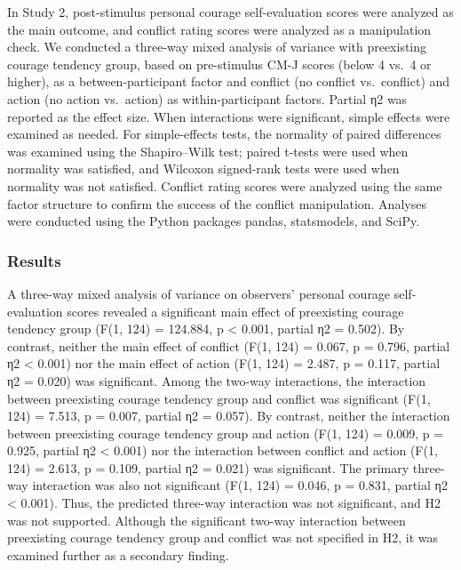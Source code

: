\documentclass[
]{article}
\begin{document}
In Study 2, post-stimulus personal courage self-evaluation scores were
analyzed as the main outcome, and conflict rating scores were analyzed
as a manipulation check. We conducted a three-way mixed analysis of
variance with preexisting courage tendency group, based on pre-stimulus
CM-J scores (below 4 vs.~4 or higher), as a between-participant factor
and conflict (no conflict vs.~conflict) and action (no action
vs.~action) as within-participant factors. Partial η2 was reported as
the effect size. When interactions were significant, simple effects were
examined as needed. For simple-effects tests, the normality of paired
differences was examined using the Shapiro--Wilk test; paired t-tests
were used when normality was satisfied, and Wilcoxon signed-rank tests
were used when normality was not satisfied. Conflict rating scores were
analyzed using the same factor structure to confirm the success of the
conflict manipulation. Analyses were conducted using the Python packages
pandas, statsmodels, and SciPy.

\subsubsection{Results}\label{results-1}

A three-way mixed analysis of variance on observers' personal courage
self-evaluation scores revealed a significant main effect of preexisting
courage tendency group (F(1, 124) = 124.884, p \textless{} 0.001,
partial η2 = 0.502). By contrast, neither the main effect of conflict
(F(1, 124) = 0.067, p = 0.796, partial η2 \textless{} 0.001) nor the
main effect of action (F(1, 124) = 2.487, p = 0.117, partial η2 = 0.020)
was significant. Among the two-way interactions, the interaction between
preexisting courage tendency group and conflict was significant (F(1,
124) = 7.513, p = 0.007, partial η2 = 0.057). By contrast, neither the
interaction between preexisting courage tendency group and action (F(1,
124) = 0.009, p = 0.925, partial η2 \textless{} 0.001) nor the
interaction between conflict and action (F(1, 124) = 2.613, p = 0.109,
partial η2 = 0.021) was significant. The primary three-way interaction
was also not significant (F(1, 124) = 0.046, p = 0.831, partial η2
\textless{} 0.001). Thus, the predicted three-way interaction was not
significant, and H2 was not supported. Although the significant two-way
interaction between preexisting courage tendency group and conflict was
not specified in H2, it was examined further as a secondary finding.
\end{document}
